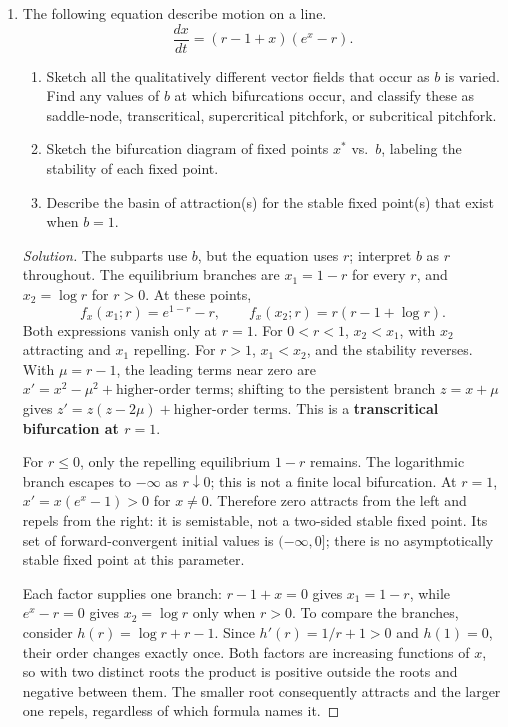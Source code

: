 \documentclass[10pt]{amsart}
\newenvironment{solution}
{\begin{proof}[Solution]}
{\end{proof}}
\begin{document}
\begin{enumerate}[label=\arabic*), leftmargin=*, itemsep=1em]
    \item The following equation describe motion on a line.
    \[
        \frac{dx}{dt} = (r-1+x)(e^x-r).
    \]
    \begin{enumerate}[label=(\alph*)]
        \item Sketch all the qualitatively different vector fields that occur as $b$ is varied. Find any values of $b$ at which bifurcations occur, and classify these as saddle-node, transcritical, supercritical pitchfork, or subcritical pitchfork.
        \item Sketch the bifurcation diagram of fixed points $x^*$ vs.\ $b$, labeling the stability of each fixed point.
        \item Describe the basin of attraction(s) for the stable fixed point(s) that exist when $b=1$.
    \end{enumerate}

    \begin{solution}

The subparts use $b$, but the equation uses $r$; interpret $b$ as $r$ throughout. The equilibrium branches are $x_1=1-r$ for every $r$, and $x_2=\log r$ for $r>0$. At these points,
\[
f_x(x_1;r)=e^{1-r}-r,\qquad f_x(x_2;r)=r(r-1+\log r).
\]
Both expressions vanish only at $r=1$. For $0<r<1$, $x_2<x_1$, with $x_2$ attracting and $x_1$ repelling. For $r>1$, $x_1<x_2$, and the stability reverses. With $\mu=r-1$, the leading terms near zero are $x'=x^2-\mu^2+\text{higher-order terms}$; shifting to the persistent branch $z=x+\mu$ gives $z'=z(z-2\mu)+\text{higher-order terms}$. This is a \textbf{transcritical bifurcation at $r=1$}.

For $r\le0$, only the repelling equilibrium $1-r$ remains. The logarithmic branch escapes to $-\infty$ as $r\downarrow0$; this is not a finite local bifurcation. At $r=1$, $x'=x(e^x-1)>0$ for $x\ne0$. Therefore zero attracts from the left and repels from the right: it is semistable, not a two-sided stable fixed point. Its set of forward-convergent initial values is $(-\infty,0]$; there is no asymptotically stable fixed point at this parameter.

Each factor supplies one branch: $r-1+x=0$ gives $x_1=1-r$, while $e^x-r=0$ gives $x_2=\log r$ only when $r>0$. To compare the branches, consider $h(r)=\log r+r-1$. Since $h'(r)=1/r+1>0$ and $h(1)=0$, their order changes exactly once. Both factors are increasing functions of $x$, so with two distinct roots the product is positive outside the roots and negative between them. The smaller root consequently attracts and the larger one repels, regardless of which formula names it.


\end{solution}
\end{enumerate}
\end{document}

